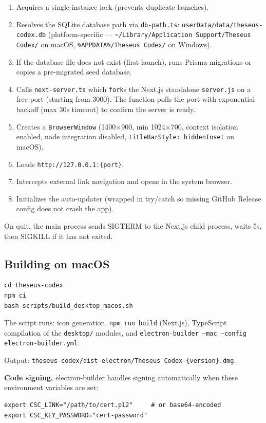 \documentclass[11pt,letterpaper]{article}
\newcommand{\file}[1]{\texttt{#1}}
\newcommand{\cmd}[1]{\texttt{#1}}
\begin{document}
\begin{enumerate}[leftmargin=1.5em,itemsep=0.1em]
  \item Acquires a single-instance lock (prevents duplicate launches).
  \item Resolves the SQLite database path via \file{db-path.ts}: \file{userData/data/theseus-codex.db} (platform-specific --- \file{\textasciitilde/Library/Application Support/Theseus Codex/} on macOS, \file{\%APPDATA\%/Theseus Codex/} on Windows).
  \item If the database file does not exist (first launch), runs Prisma migrations or copies a pre-migrated seed database.
  \item Calls \file{next-server.ts} which \cmd{fork}s the Next.js standalone \file{server.js} on a free port (starting from 3000). The function polls the port with exponential backoff (max 30s timeout) to confirm the server is ready.
  \item Creates a \cmd{BrowserWindow} (1400$\times$900, min 1024$\times$700, context isolation enabled, node integration disabled, \cmd{titleBarStyle: hiddenInset} on macOS).
  \item Loads \cmd{http://127.0.0.1:\{port\}}.
  \item Intercepts external link navigation and opens in the system browser.
  \item Initializes the auto-updater (wrapped in try/catch so missing GitHub Release config does not crash the app).
\end{enumerate}

On quit, the main process sends SIGTERM to the Next.js child process, waits 5s, then SIGKILL if it has not exited.

\subsection{Building on macOS}

\begin{lstlisting}
cd theseus-codex
npm ci
bash scripts/build_desktop_macos.sh
\end{lstlisting}

The script runs: icon generation, \cmd{npm run build} (Next.js), TypeScript compilation of the \file{desktop/} modules, and \cmd{electron-builder --mac --config electron-builder.yml}.

Output: \file{theseus-codex/dist-electron/Theseus Codex-\{version\}.dmg}.

\textbf{Code signing.} electron-builder handles signing automatically when these environment variables are set:
\begin{lstlisting}
export CSC_LINK="/path/to/cert.p12"     # or base64-encoded
export CSC_KEY_PASSWORD="cert-password"
\end{lstlisting}
\end{document}
